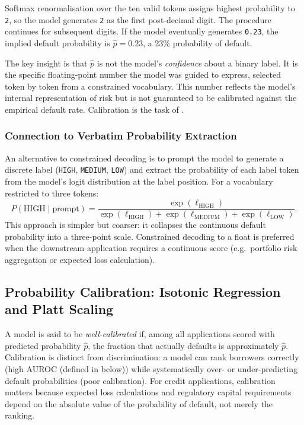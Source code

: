 \begin{context}
Softmax renormalisation over the ten valid tokens assigns highest probability to \texttt{2}, so the model generates \texttt{2} as the first post-decimal digit. The procedure continues for subsequent digits. If the model eventually generates \texttt{0.23}, the implied default probability is $\hat{p} = 0.23$, a 23\% probability of default.

The key insight is that $\hat{p}$ is not the model's \emph{confidence} about a binary label. It is the specific floating-point number the model was guided to express, selected token by token from a constrained vocabulary. This number reflects the model's internal representation of risk but is not guaranteed to be calibrated against the empirical default rate. Calibration is the task of .

\subsubsection*{Connection to Verbatim Probability Extraction}

An alternative to constrained decoding is to prompt the model to generate a discrete label (\texttt{HIGH}, \texttt{MEDIUM}, \texttt{LOW}) and extract the probability of each label token from the model's logit distribution at the label position. For a vocabulary restricted to three tokens:
\begin{equation}
  P(\text{HIGH} \mid \text{prompt}) = \frac{\exp(\ell_{\text{HIGH}})}{\exp(\ell_{\text{HIGH}}) + \exp(\ell_{\text{MEDIUM}}) + \exp(\ell_{\text{LOW}})}.
  \label{eq:label-prob}
\end{equation}
This approach is simpler but coarser: it collapses the continuous default probability into a three-point scale. Constrained decoding to a float is preferred when the downstream application requires a continuous score (e.g.\ portfolio risk aggregation or expected loss calculation).

\subsection{Probability Calibration: Isotonic Regression and Platt Scaling}
\label{subsec:calibration}

A model is said to be \emph{well-calibrated} if, among all applications scored with predicted probability $\hat{p}$, the fraction that actually defaults is approximately $\hat{p}$. Calibration is distinct from discrimination: a model can rank borrowers correctly (high AUROC (defined in  below)) while systematically over- or under-predicting default probabilities (poor calibration). For credit applications, calibration matters because expected loss calculations and regulatory capital requirements depend on the absolute value of the probability of default, not merely the ranking.


\end{context}
